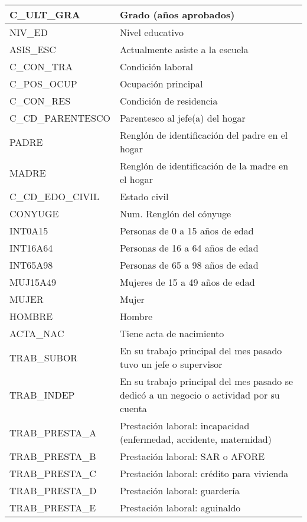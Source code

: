 \begin{longtable}{|p{8cm}|p{8cm}|}
    \hline
    C\_ULT\_GRA & Grado (años aprobados) \\
    \hline
    NIV\_ED & Nivel educativo \\
    \hline
    ASIS\_ESC & Actualmente asiste a la escuela \\
    \hline
    C\_CON\_TRA & Condición laboral \\
    \hline
    C\_POS\_OCUP & Ocupación principal \\
    \hline
    C\_CON\_RES & Condición de residencia \\
    \hline
    C\_CD\_PARENTESCO & Parentesco al jefe(a) del hogar \\
    \hline
    PADRE & Renglón de identificación del padre en el hogar \\
    \hline
    MADRE & Renglón de identificación de la madre en el hogar \\
    \hline
    C\_CD\_EDO\_CIVIL & Estado civil \\
    \hline
    CONYUGE & Num. Renglón del cónyuge \\
    \hline
    INT0A15 & Personas de 0 a 15 años de edad \\
    \hline
    INT16A64 & Personas de 16 a 64 años de edad \\
    \hline
    INT65A98 & Personas de 65 a 98 años de edad \\
    \hline
    MUJ15A49 & Mujeres de 15 a 49 años de edad \\
    \hline
    MUJER & Mujer \\
    \hline
    HOMBRE & Hombre \\
    \hline
    ACTA\_NAC & Tiene acta de nacimiento \\
    \hline
    TRAB\_SUBOR & En su trabajo principal del mes pasado tuvo un jefe o supervisor \\
    \hline
    TRAB\_INDEP & En su trabajo principal del mes pasado se dedicó a un negocio o actividad por su cuenta \\
    \hline
    TRAB\_PRESTA\_A & Prestación laboral: incapacidad (enfermedad, accidente, maternidad)\\
    \hline
    TRAB\_PRESTA\_B & Prestación laboral: SAR o AFORE \\
    \hline
    TRAB\_PRESTA\_C & Prestación laboral: crédito para vivienda \\
    \hline
    TRAB\_PRESTA\_D & Prestación laboral: guardería \\
    \hline
    TRAB\_PRESTA\_E & Prestación laboral: aguinaldo \\

\end{longtable}
